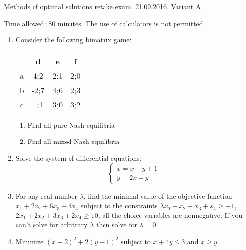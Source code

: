 \documentclass[12pt,a4paper]{article}
\begin{document}
Methods of optimal solutions retake exam. 21.09.2016. Variant A.

Time allowed: 80 minutes. The use of calculators is not permitted.

\begin{enumerate}
\item   Consider the following bimatrix game:


\begin{tabular}{c|ccc}
 & d & e & f \\ 
\hline 
a & 4;2 & 2;1 & 2;0  \\ 
b & -2;7 & 4;6 & 2;3  \\ 
c & 1;1 & 3;0 & 3;2  \\ 
\end{tabular} 

\begin{enumerate}
\item Find all pure Nash equilibria
\item Find all mixed Nash equilibria
\end{enumerate}

\item Solve the system of differential equations:
\[
\begin{cases}
\dot{x}=x-y + 1\\
\dot{y}=2x-y
\end{cases}
\]

\item For any real number $\lambda$, find the minimal value of the objective function $x_1+2x_2+6x_3+4x_4$ subject to the constraints  $\lambda x_1-x_2+x_3+x_4\geq -1$, $2x_1+2x_2+3x_3+2x_4 \geq 10$,  all the choice variables are nonnegative. If you can't solve for arbitrary $\lambda$ then solve for $\lambda = 0$.


\item Minimize $(x-2)^2+2 (y-1)^2$ subject to $x+4y\leq 3$ and $x\geq y$.




\end{enumerate}
\end{document}
